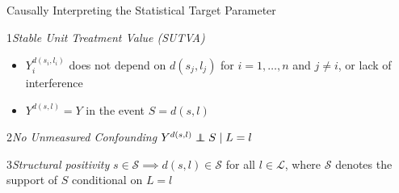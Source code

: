 \documentclass{beamer}
\begin{document}
\begin{frame}[c]{Causally Interpreting the Statistical Target Parameter}

\begin{center}
\begin{tcolorbox}
\begin{assumption}{1}{\textit{Stable Unit Treatment Value (SUTVA)}}\label{sutva}
  \begin{itemize}
    \itemsep2pt
    \item $Y^{d(s_i, l_i)}_i$ does not depend on $d(s_j, l_j)$ for
        $i = 1, \ldots, n$ and $j \neq i$, or lack of
        interference~\citep{cox1958planning}
     \item $Y^{d(s, l)} = Y$ in the event $S = d(s, l)$
  \end{itemize}
\end{assumption}
\end{tcolorbox}
\vspace{-0.7em}
\begin{tcolorbox}
\begin{assumption}{2}{\textit{No Unmeasured Confounding}}\label{ignorability}
  $Y^{d(s, l)} \indep S \mid L = l$
\end{assumption}
\end{tcolorbox}
\vspace{-0.7em}
\begin{tcolorbox}
\begin{assumption}{3}{\textit{Structural positivity}}\label{positivity}
  $s \in \mathcal{S} \implies d(s, l) \in \mathcal{S}$ for all
  $l \in \mathcal{L}$, where $\mathcal{S}$ denotes the support of $S$
  conditional on $L = l$
\end{assumption}
\end{tcolorbox}
\end{center}

\end{frame}

\end{document}
